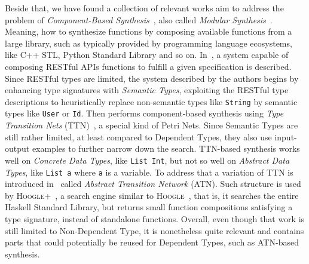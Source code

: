 \documentclass[]{report}
\begin{document}
Beside that, we have found a collection of relevant works aim to
address the problem of \emph{Component-Based
  Synthesis}~\cite{Feng2017}, also called \emph{Modular
  Synthesis}~\cite{Heineman2016}.  Meaning, how to synthesize
functions by composing available functions from a large library, such
as typically provided by programming language ecosystems, like C++
STL, Python Standard Library and so on.  In~\cite{Guo2022}, a system
capable of composing RESTful APIs functions to fulfill a given
specification is described.  Since RESTful types are limited, the
system described by the authors begins by enhancing type signatures
with \emph{Semantic Types}, exploiting the RESTful type descriptions
to heuristically replace non-semantic types like \texttt{String} by
semantic types like \texttt{User} or \texttt{Id}.  Then performs
component-based synthesis using \emph{Type Transition Nets}
(TTN)~\cite{Feng2017}, a special kind of Petri Nets.  Since Semantic
Types are still rather limited, at least compared to Dependent Types,
they also use input-output examples to further narrow down the search.
TTN-based synthesis works well on \emph{Concrete Data Types}, like
\texttt{List Int}, but not so well on \emph{Abstract Data Types}, like
\texttt{List a} where \texttt{a} is a variable.  To address that a
variation of TTN is introduced in~\cite{Guo2020} called \emph{Abstract
  Transition Network} (ATN).  Such structure is used by
\textsc{Hoogle+}~\cite{Michael2020}, a search engine similar to
\textsc{Hoogle}~\cite{Mitchell2004}, that is, it searches the entire
Haskell Standard Library, but returns small function compositions
satisfying a type signature, instead of standalone functions.
Overall, even though that work is still limited to Non-Dependent Type,
it is nonetheless quite relevant and contains parts that could
potentially be reused for Dependent Types, such as ATN-based
synthesis.
\end{document}

